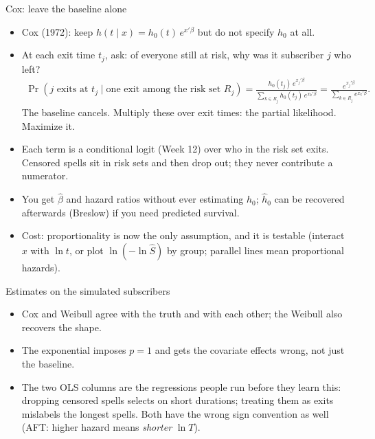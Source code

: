 \documentclass[aspectratio=169,11pt]{beamer}
\begin{document}
\begin{frame}{Cox: leave the baseline alone}
\begin{itemize}
	\item Cox (1972): keep $h(t \mid x) = h_0(t)\,e^{x'\beta}$ but do not specify $h_0$ at all.
	\medskip
	\item At each exit time $t_j$, ask: of everyone still at risk, why was it subscriber $j$ who left?
	\begin{align*}
		\Pr(j \text{ exits at } t_j \mid \text{one exit among the risk set } R_j)
		= \frac{h_0(t_j)\,e^{x_j'\beta}}{\sum_{k \in R_j} h_0(t_j)\,e^{x_k'\beta}}
		= \frac{e^{x_j'\beta}}{\sum_{k \in R_j} e^{x_k'\beta}} .
	\end{align*}
	The baseline cancels. Multiply these over exit times: the \alert{partial likelihood}. Maximize it.
	\medskip
	\item Each term is a conditional logit (Week 12) over who in the risk set exits. Censored spells
	sit in risk sets and then drop out; they never contribute a numerator.
	\medskip
	\item You get $\hat\beta$ and hazard ratios without ever estimating $h_0$; $\hat h_0$ can be recovered
	afterwards (Breslow) if you need predicted survival.
	\medskip
	\item Cost: proportionality is now the only assumption, and it is testable (interact $x$ with $\ln t$,
	or plot $\ln(-\ln \hat S)$ by group; parallel lines mean proportional hazards).
\end{itemize}
\end{frame}


\begin{frame}{Estimates on the simulated subscribers}
\begin{center}
\scriptsize

\end{center}
\medskip
\begin{itemize}
	\item Cox and Weibull agree with the truth and with each other; the Weibull also recovers the shape.
	\item The exponential imposes $p = 1$ and gets the covariate effects wrong, not just the baseline.
	\item The two OLS columns are the regressions people run before they learn this: dropping censored
	spells selects on short durations; treating them as exits mislabels the longest spells. Both have the
	wrong sign convention as well (AFT: higher hazard means \emph{shorter} $\ln T$).
\end{itemize}
\end{frame}
\end{document}
